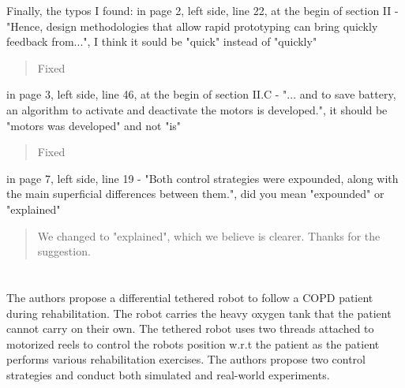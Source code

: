 \documentclass[journal,onecolumn,12pt]{IEEEtran}
\begin{document}
Finally, the typos I found:
      in page 2, left side, line 22, at the begin of section II - "Hence, design methodologies that allow rapid prototyping can bring quickly feedback from...", I think it sould be "quick" instead of "quickly"
      
 \begin{quotation}
{\color{blue}
Fixed
}
\end{quotation}     
      
      in page 3, left side, line 46, at the begin of section II.C - "... and to save battery, an algorithm to activate and deactivate the motors is developed.", it should be "motors was developed" and not "is"

\begin{quotation}
{\color{blue}
Fixed
}
\end{quotation}

      in page 7, left side, line 19 - "Both control strategies were expounded, along with the main superficial differences between them.", did you mean "expounded" or "explained"
      
      
      \begin{quotation}
{\color{blue}
We changed to "explained", which we believe is clearer.  Thanks for the suggestion.
}
\end{quotation}

\section*{}

The authors propose a differential tethered robot to follow a COPD patient during rehabilitation. The robot carries the heavy oxygen tank that the patient cannot carry on their own. The tethered robot uses two threads attached to motorized reels to control the robots position w.r.t the patient as the patient performs various rehabilitation exercises. The authors propose two control strategies and conduct both simulated and real-world experiments.

\vspace{2em}
\end{document}
